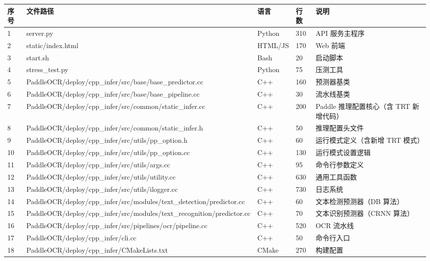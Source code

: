 \documentclass[12pt,a4paper]{ctexart}
\begin{document}
\begin{longtable}{|p{1.2cm}|p{6.5cm}|p{1.5cm}|p{1.5cm}|p{2cm}|}
\hline
\textbf{序号} & \textbf{文件路径} & \textbf{语言} & \textbf{行数} & \textbf{说明} \\\hline
1 & server.py & Python & 310 & API 服务主程序 \\\hline
2 & static/index.html & HTML/JS & 170 & Web 前端 \\\hline
3 & start.sh & Bash & 20 & 启动脚本 \\\hline
4 & stress\_test.py & Python & 75 & 压测工具 \\\hline
5 & PaddleOCR/deploy/cpp\_infer/src/base/base\_predictor.cc & C++ & 160 & 预测器基类 \\\hline
6 & PaddleOCR/deploy/cpp\_infer/src/base/base\_pipeline.cc & C++ & 30 & 流水线基类 \\\hline
7 & PaddleOCR/deploy/cpp\_infer/src/common/static\_infer.cc & C++ & 200 & Paddle 推理配置核心（含 TRT 新增代码） \\\hline
8 & PaddleOCR/deploy/cpp\_infer/src/common/static\_infer.h & C++ & 50 & 推理配置头文件 \\\hline
9 & PaddleOCR/deploy/cpp\_infer/src/utils/pp\_option.h & C++ & 60 & 运行模式定义（含新增 TRT 模式） \\\hline
10 & PaddleOCR/deploy/cpp\_infer/src/utils/pp\_option.cc & C++ & 130 & 运行模式设置逻辑 \\\hline
11 & PaddleOCR/deploy/cpp\_infer/src/utils/args.cc & C++ & 95 & 命令行参数定义 \\\hline
12 & PaddleOCR/deploy/cpp\_infer/src/utils/utility.cc & C++ & 630 & 通用工具函数 \\\hline
13 & PaddleOCR/deploy/cpp\_infer/src/utils/ilogger.cc & C++ & 730 & 日志系统 \\\hline
14 & PaddleOCR/deploy/cpp\_infer/src/modules/text\_detection/predictor.cc & C++ & 60 & 文本检测预测器（DB 算法） \\\hline
15 & PaddleOCR/deploy/cpp\_infer/src/modules/text\_recognition/predictor.cc & C++ & 70 & 文本识别预测器（CRNN 算法） \\\hline
16 & PaddleOCR/deploy/cpp\_infer/src/pipelines/ocr/pipeline.cc & C++ & 520 & OCR 流水线 \\\hline
17 & PaddleOCR/deploy/cpp\_infer/cli.cc & C++ & 50 & 命令行入口 \\\hline
18 & PaddleOCR/deploy/cpp\_infer/CMakeLists.txt & CMake & 270 & 构建配置 \\\hline
\end{longtable}
\end{document}
